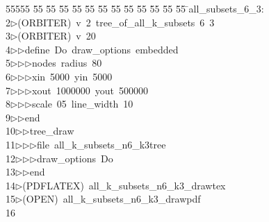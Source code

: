 %
%
\begin{tabbing}
55555 \= 55 \= 55 \= 55 \= 55 \= 55 \= 55 \= 55 \= 55 \= 55 \= 55 \= 55 \= 55 \= \>all\_subsets\_6\_3:\\[0pt]
2\>$\triangleright$\>(ORBITER)\ v\ 2\ tree\_of\_all\_k\_subsets\ 6\ 3\\[0pt]
3\>$\triangleright$\>(ORBITER)\ v\ 20\ \\[0pt]
4\>$\triangleright$\>$\triangleright$\>define\ Do\ draw\_options\ embedded\ \\[0pt]
5\>$\triangleright$\>$\triangleright$\>$\triangleright$\>nodes\ radius\ 80\ \\[0pt]
6\>$\triangleright$\>$\triangleright$\>$\triangleright$\>xin\ 5000\ yin\ 5000\ \\[0pt]
7\>$\triangleright$\>$\triangleright$\>$\triangleright$\>xout\ 1000000\ yout\ 500000\ \\[0pt]
8\>$\triangleright$\>$\triangleright$\>$\triangleright$\>scale\ 05\ line\_width\ 10\ \\[0pt]
9\>$\triangleright$\>$\triangleright$\>end\ \\[0pt]
10\>$\triangleright$\>$\triangleright$\>tree\_draw\ \\[0pt]
11\>$\triangleright$\>$\triangleright$\>$\triangleright$\>file\ all\_k\_subsets\_n6\_k3tree\ \\[0pt]
12\>$\triangleright$\>$\triangleright$\>$\triangleright$\>draw\_options\ Do\ \\[0pt]
13\>$\triangleright$\>$\triangleright$\>end\\[0pt]
14\>$\triangleright$\>(PDFLATEX)\ all\_k\_subsets\_n6\_k3\_drawtex\\[0pt]
15\>$\triangleright$\>(OPEN)\ all\_k\_subsets\_n6\_k3\_drawpdf\\[0pt]
16\>\end{tabbing}
